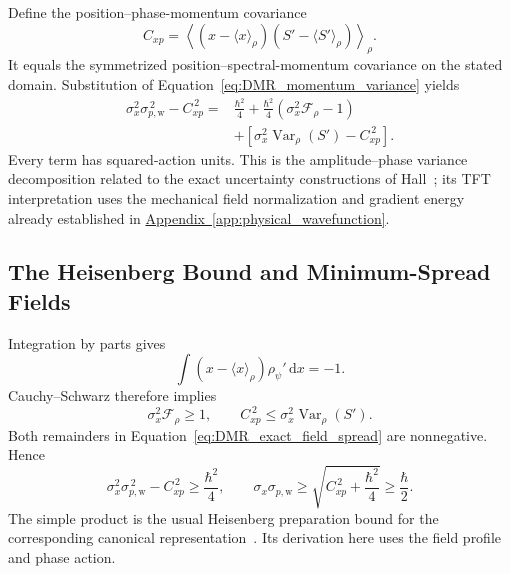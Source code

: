 Define the position--phase-momentum covariance
\begin{equation}
 C_{xp}=\left\langle
 (x-\langle x\rangle_\rho)(S'-\langle S'\rangle_\rho)
 \right\rangle_\rho.
\label{eq:DMR_field_covariance}
\end{equation}
It equals the symmetrized position--spectral-momentum covariance on the stated domain. Substitution of Equation~\eqref{eq:DMR_momentum_variance} yields
\begin{equation}
\boxed{\begin{aligned}
 \sigma_x^2\sigma_{p,\mathrm w}^{\,2}-C_{xp}^{\,2}
 ={}&\frac{\hbar^2}{4}
 +\frac{\hbar^2}{4}\left(\sigma_x^2\mathcal F_\rho-1\right)\\
 &+\left[\sigma_x^2\operatorname{Var}_\rho(S')-C_{xp}^{\,2}\right].
\end{aligned}}
\label{eq:DMR_exact_field_spread}
\end{equation}
Every term has squared-action units. This is the amplitude--phase variance decomposition related to the exact uncertainty constructions of Hall~\cite{DMR_Hall2001}; its TFT interpretation uses the mechanical field normalization and gradient energy already established in \hyperref[app:physical_wavefunction]{Appendix~\ref*{app:physical_wavefunction}}.

\subsection{The Heisenberg Bound and Minimum-Spread Fields}

Integration by parts gives
\begin{equation}
 \int(x-\langle x\rangle_\rho)\rho_\psi'\,\mathrm dx=-1.
\end{equation}
Cauchy--Schwarz therefore implies
\begin{equation}
 \sigma_x^2\mathcal F_\rho\geq1,
 \qquad
 C_{xp}^{\,2}\leq\sigma_x^2\operatorname{Var}_\rho(S').
\label{eq:DMR_positive_remainders}
\end{equation}
Both remainders in Equation~\eqref{eq:DMR_exact_field_spread} are nonnegative. Hence
\begin{equation}
 \boxed{
 \sigma_x^2\sigma_{p,\mathrm w}^{\,2}-C_{xp}^{\,2}
 \geq\frac{\hbar^2}{4},
 \qquad
 \sigma_x\sigma_{p,\mathrm w}\geq
 \sqrt{C_{xp}^{\,2}+\frac{\hbar^2}{4}}
 \geq\frac{\hbar}{2}
 }.
\label{eq:DMR_heisenberg_bound}
\end{equation}
The simple product is the usual Heisenberg preparation bound for the corresponding canonical representation~\cite{DMR_Robertson1929}. Its derivation here uses the field profile and phase action.

